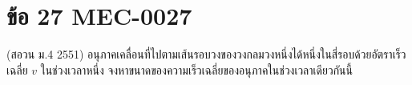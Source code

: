 \section*{ข้อ 27 \hfill \normalsize MEC-0027}
(สอวน ม.4 2551) อนุภาคเคลื่อนที่ไปตามเส้นรอบวงของวงกลมวงหนึ่งได้หนึ่งในสี่รอบด้วยอัตราเร็วเฉลี่ย $v$ ในช่วงเวลาหนึ่ง จงหาขนาดของความเร็วเฉลี่ยของอนุภาคในช่วงเวลาเดียวกันนี้
\medskip
